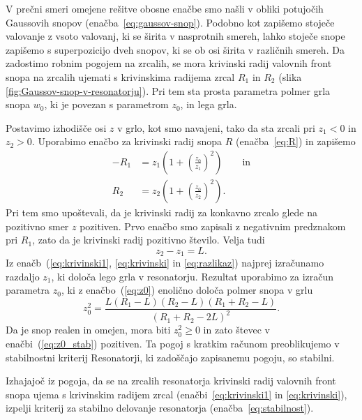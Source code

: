 V prečni smeri omejene rešitve obosne enačbe smo našli v obliki potujočih
Gaussovih snopov (enačba~\ref{eq:gaussov-snop}). 
Podobno kot zapišemo stoječe valovanje z vsoto valovanj, ki se širita v nasprotnih smereh,
lahko stoječe snope zapišemo s superpozicijo dveh snopov, ki se ob osi širita v različnih smereh. 
Da zadostimo robnim pogojem na zrcalih, se mora krivinski radij valovnih front 
snopa na zrcalih ujemati s krivinskima radijema zrcal $R_{1}$ in $R_{2}$ 
(slika \ref{fig:Gaussov-snop-v-resonatorju}).
Pri tem sta prosta parametra polmer grla snopa $w_0$, 
ki je povezan s parametrom $z_{0}$, in lega grla. 

Postavimo izhodišče osi $z$ v grlo, kot smo
navajeni, tako da sta zrcali pri $z_{1}<0$ in $z_{2}>0$. Uporabimo enačbo
za krivinski radij snopa $R$ (enačba~\ref{eq:R})  in zapišemo 
\begin{align}
-R_{1} & =  z_{1}\left(1+\left(\frac{z_{0}}{z_{1}}\right)^{2}\right) \qquad  \label{eq:krivinski1} \textrm{in}\\
R_{2}  &=  z_{2}\left(1+\left(\frac{z_{0}}{z_{2}}\right)^{2}\right)\!.
\label{eq:krivinski}
\end{align}
Pri tem smo upoštevali, da je krivinski radij za konkavno zrcalo glede na 
pozitivno smer $z$ pozitiven. Prvo enačbo smo zapisali z negativnim 
predznakom pri $R_1$, zato da je krivinski radij pozitivno število.
Velja tudi 
\begin{equation}
z_{2}-z_{1}=L.
\label{eq:razlikaz}
\end{equation}
Iz  enačb~(\ref{eq:krivinski1}, \ref{eq:krivinski} in \ref{eq:razlikaz}) 
najprej izračunamo razdaljo $z_{1}$, ki določa
lego grla v resonatorju. Rezultat uporabimo za izračun parametra $z_{0}$, ki z
enačbo~(\ref{eq:z0}) enolično določa polmer snopa v grlu
\begin{equation}
z_{0}^{2}=\frac{L(R_{1}-L)(R_{2}-L)(R_{1}+R_{2}-L)}{(R_{1}+R_{2}-2L)^{2}}.
\label{eq:z0_stab}
\end{equation}
Da je snop realen in omejen, mora biti $z_{0}^{2}\geq0$ in zato števec
v enačbi~(\ref{eq:z0_stab}) pozitiven. Ta pogoj s kratkim računom preoblikujemo
v stabilnostni kriterij
Resonatorji, ki zadoščajo zapisanemu pogoju, so stabilni. 

\begin{definition}
Izhajajoč iz pogoja, da se na zrcalih resonatorja krivinski radij valovnih front snopa ujema s krivinskim
radijem zrcal (enačbi~\ref{eq:krivinski1} in \ref{eq:krivinski}), izpelji 
kriterij za stabilno delovanje resonatorja 
(enačba~\ref{eq:stabilnost}).
\end{definition}

